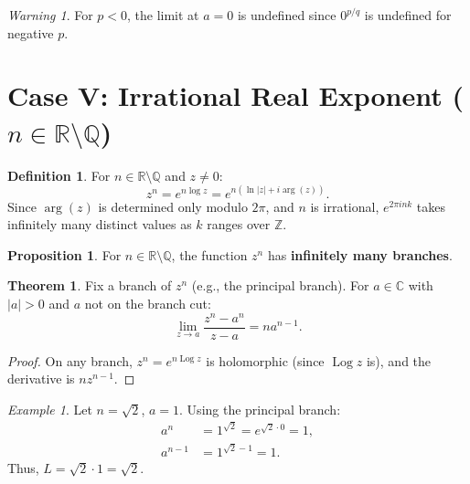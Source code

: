 \documentclass{article}
\theoremstyle{definition}
\newtheorem{definition}{Definition}[section]
\newtheorem{theorem}{Theorem}[section]
\newtheorem{proposition}{Proposition}[section]
\theoremstyle{remark}
\newtheorem{example}{Example}[section]
\newtheorem{warning}{Warning}[section]
\newcommand{\C}{\mathbb{C}}
\newcommand{\R}{\mathbb{R}}
\newcommand{\Z}{\mathbb{Z}}
\newcommand{\Q}{\mathbb{Q}}
\newcommand{\Log}{\operatorname{Log}}
\begin{document}
\begin{warning}
For $p < 0$, the limit at $a = 0$ is undefined since $0^{p/q}$ is undefined for negative $p$.
\end{warning}

\section{Case V: Irrational Real Exponent ($n \in \R \setminus \Q$)}

\begin{definition}
For $n \in \R \setminus \Q$ and $z \neq 0$:
\begin{equation}
z^n = e^{n \log z} = e^{n(\ln|z| + i\arg(z))}.
\end{equation}
Since $\arg(z)$ is determined only modulo $2\pi$, and $n$ is irrational, $e^{2\pi i n k}$ takes infinitely many distinct values as $k$ ranges over $\Z$.
\end{definition}

\begin{proposition}
For $n \in \R \setminus \Q$, the function $z^n$ has \textbf{infinitely many branches}.
\end{proposition}

\begin{theorem}
Fix a branch of $z^n$ (e.g., the principal branch). For $a \in \C$ with $|a| > 0$ and $a$ not on the branch cut:
\begin{equation}
\lim_{z \to a} \frac{z^n - a^n}{z - a} = n a^{n-1}.
\end{equation}
\end{theorem}

\begin{proof}
On any branch, $z^n = e^{n \Log z}$ is holomorphic (since $\Log z$ is), and the derivative is $n z^{n-1}$.
\end{proof}

\begin{example}
Let $n = \sqrt{2}$, $a = 1$. Using the principal branch:
\begin{align}
a^n &= 1^{\sqrt{2}} = e^{\sqrt{2} \cdot 0} = 1, \\
a^{n-1} &= 1^{\sqrt{2}-1} = 1.
\end{align}
Thus, $L = \sqrt{2} \cdot 1 = \sqrt{2}$.
\end{example}

\end{document}
